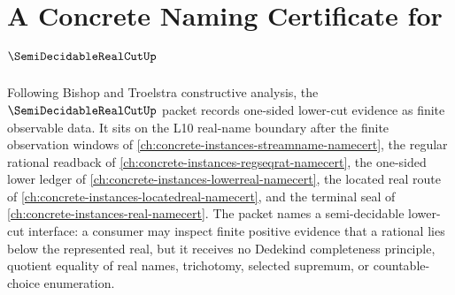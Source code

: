 \chapter{A Concrete Naming Certificate for $\SemiDecidableRealCutUp$}
\label{ch:concrete-instances-semi-decidable-real-cut-namecert}

Following Bishop and Troelstra constructive analysis, the $\SemiDecidableRealCutUp$ packet records one-sided lower-cut evidence as finite observable data. It sits on the L10 real-name boundary after the finite observation windows of \autoref{ch:concrete-instances-streamname-namecert}, the regular rational readback of \autoref{ch:concrete-instances-regseqrat-namecert}, the one-sided lower ledger of \autoref{ch:concrete-instances-lowerreal-namecert}, the located real route of \autoref{ch:concrete-instances-locatedreal-namecert}, and the terminal seal of \autoref{ch:concrete-instances-real-namecert}. The packet names a semi-decidable lower-cut interface: a consumer may inspect finite positive evidence that a rational lies below the represented real, but it receives no Dedekind completeness principle, quotient equality of real names, trichotomy, selected supremum, or countable-choice enumeration.

